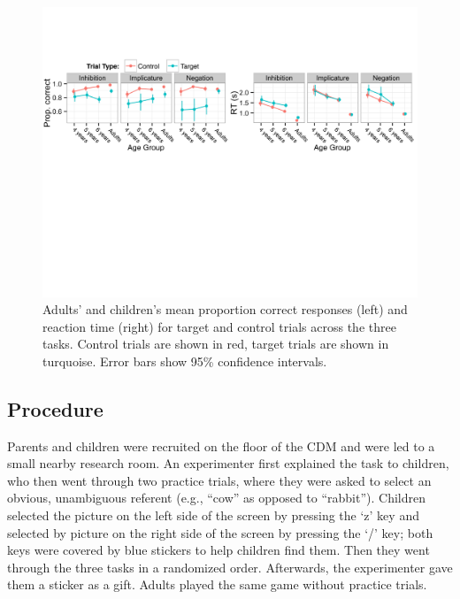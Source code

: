 \documentclass[10pt,letterpaper]{article}
\begin{document}
\begin{figure}[t!]
\begin{center}
\includegraphics[width=\textwidth]{figures/correct_RT_v2.pdf}
\caption{\label{fig:traditional} Adults' and children's mean proportion correct responses (left) and reaction time (right) for target and control trials across the three tasks. Control trials are shown in red, target trials are shown in turquoise. Error bars show 95\% confidence intervals. }
\end{center}
\end{figure}

\subsection{Procedure}

Parents and children were recruited on the floor of the CDM and were led to a small nearby research room.   An experimenter first explained the task to children, who then went through two practice trials, where they were asked to select an obvious, unambiguous referent (e.g., ``cow'' as opposed to ``rabbit''). Children selected the picture on the left side of the screen by pressing the `z' key and selected by picture on the right side of the screen by pressing the `/' key; both keys were covered by blue stickers to help children find them. Then they went through the three tasks in a randomized order. Afterwards, the experimenter gave them a sticker as a gift. Adults played the same game without practice trials.
\end{document}
